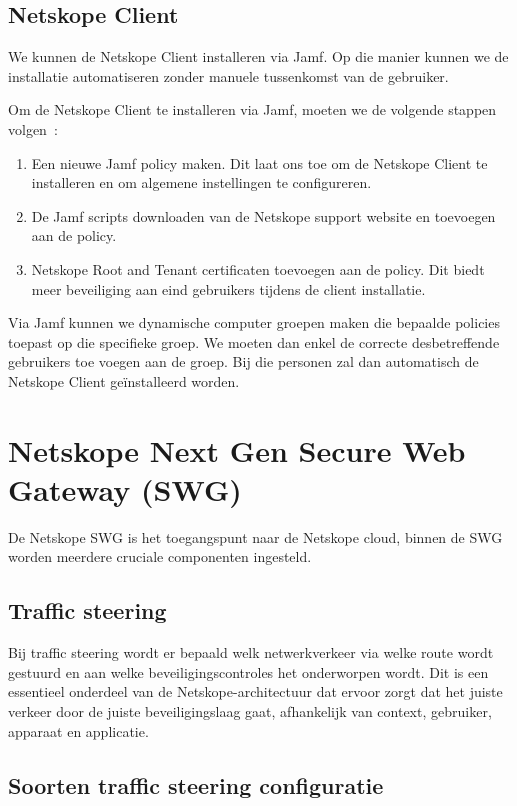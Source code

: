 \subsection{Netskope Client}
We kunnen de Netskope Client installeren via Jamf. Op die manier kunnen we de installatie automatiseren zonder manuele tussenkomst van de gebruiker.

\vspace{2ex}

Om de Netskope Client te installeren via Jamf, moeten we de volgende stappen volgen~\autocite{Netskope2025-9}:

\begin{enumerate}
    \item Een nieuwe Jamf policy maken. Dit laat ons toe om de Netskope Client te installeren en om algemene instellingen te configureren.
    \item De Jamf scripts downloaden van de Netskope support website en toevoegen aan de policy.
    \item Netskope Root and Tenant certificaten toevoegen aan de policy. Dit biedt meer beveiliging aan eind gebruikers tijdens de client installatie.
\end{enumerate}

Via Jamf kunnen we dynamische computer groepen maken die bepaalde policies toepast op die specifieke groep. We moeten dan enkel de correcte desbetreffende gebruikers toe voegen aan de groep. Bij die personen zal dan automatisch de Netskope Client geïnstalleerd worden.

\section{Netskope Next Gen Secure Web Gateway (SWG)}
De Netskope SWG is het toegangspunt naar de Netskope cloud, binnen de SWG worden meerdere cruciale componenten ingesteld.

\subsection{Traffic steering}
Bij traffic steering wordt er bepaald welk netwerkverkeer via welke route wordt gestuurd en aan welke beveiligingscontroles het onderworpen wordt. Dit is een essentieel onderdeel van de Netskope-architectuur dat ervoor zorgt dat het juiste verkeer door de juiste beveiligingslaag gaat, afhankelijk van context, gebruiker, apparaat en applicatie.

\subsection{Soorten traffic steering configuratie}

